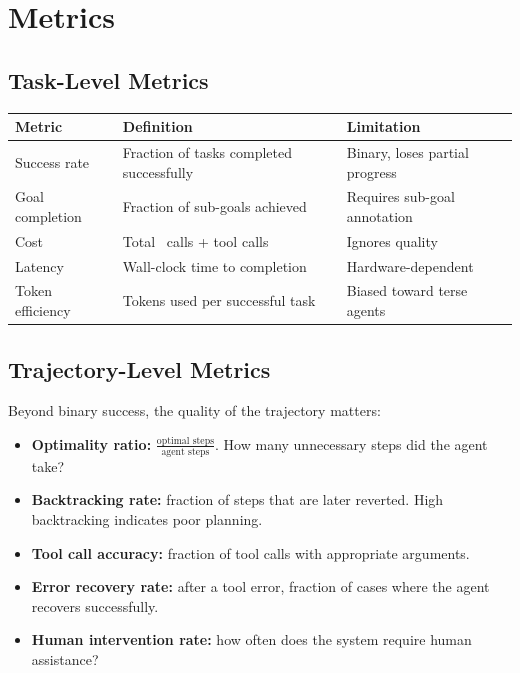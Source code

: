 \section{Metrics}

\subsection{Task-Level Metrics}

\begin{longtable}{p{4cm}p{4cm}p{4cm}}
	\toprule
	\textbf{Metric}  & \textbf{Definition}                      & \textbf{Limitation}            \\
	\midrule
	Success rate     & Fraction of tasks completed successfully & Binary, loses partial progress \\
	Goal completion  & Fraction of sub-goals achieved           & Requires sub-goal annotation   \\
	Cost             & Total \llm\ calls + tool calls           & Ignores quality                \\
	Latency          & Wall-clock time to completion            & Hardware-dependent             \\
	Token efficiency & Tokens used per successful task          & Biased toward terse agents     \\
	\bottomrule
\end{longtable}

\subsection{Trajectory-Level Metrics}

Beyond binary success, the quality of the trajectory matters:

\begin{itemize}
	\item \textbf{Optimality ratio:} $\frac{\text{optimal steps}}{\text{agent steps}}$. How many unnecessary steps did the agent take?
	\item \textbf{Backtracking rate:} fraction of steps that are later reverted. High backtracking indicates poor planning.
	\item \textbf{Tool call accuracy:} fraction of tool calls with appropriate arguments.
	\item \textbf{Error recovery rate:} after a tool error, fraction of cases where the agent recovers successfully.
	\item \textbf{Human intervention rate:} how often does the system require human assistance?
\end{itemize}

